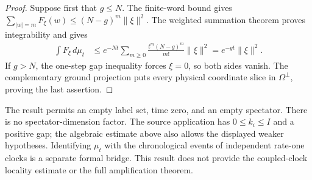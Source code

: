 \begin{proof}
    \leanok
    Suppose first that $g\le N$.  The finite-word bound gives
    $\sum_{|w|=m}F_\xi(w)\le(N-g)^m\|\xi\|^2$.
    The weighted summation theorem proves integrability and gives
    \begin{align}
        \int F_\xi\,d\mu_t
        &\le e^{-Nt}\sum_{m\ge0}\frac{t^m(N-g)^m}{m!}\|\xi\|^2
         =e^{-gt}\|\xi\|^2.
        \label{eq:poisson_contraction_series}
    \end{align}
    If $g>N$, the one-step gap inequality forces $\xi=0$, so both sides
    vanish.  The complementary ground projection puts every physical
    coordinate slice in $\Omega^\perp$, proving the last assertion.
\end{proof}

The result permits an empty label set, time zero, and an empty spectator.
There is no spectator-dimension factor.  The source application has
$0\le k_i\le I$ and a positive gap; the algebraic estimate above also
allows the displayed weaker hypotheses.  Identifying $\mu_t$ with the
chronological events of independent rate-one clocks is a separate formal
bridge.  This result does not provide the coupled-clock locality estimate or the
full amplification theorem.
